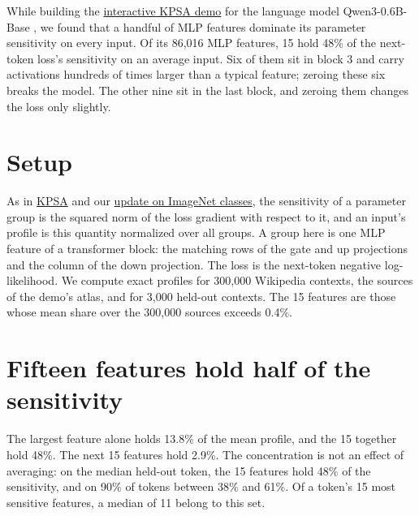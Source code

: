 \documentclass[11pt]{article}
\begin{document}

\begin{publicationhead}
\makepublicationtitle
\end{publicationhead}

While building the \href{https://axym.org/work/kpsa-demo/}{interactive KPSA demo} for the language model Qwen3-0.6B-Base \cite{qwen3}, we found that a handful of MLP features dominate its parameter sensitivity on every input. Of its 86,016 MLP features, 15 hold 48\% of the next-token loss's sensitivity on an average input. Six of them sit in block 3 and carry activations hundreds of times larger than a typical feature; zeroing these six breaks the model. The other nine sit in the last block, and zeroing them changes the loss only slightly.

\section{Setup}\label{setup}

As in \href{https://axym.org/work/kpsa/}{KPSA} \cite{kpsa} and our \href{https://axym.org/work/kpsa-class-sensitivity/}{update on ImageNet classes}, the sensitivity of a parameter group is the squared norm of the loss gradient with respect to it, and an input's profile is this quantity normalized over all groups. A group here is one MLP feature of a transformer block: the matching rows of the gate and up projections and the column of the down projection. The loss is the next-token negative log-likelihood. We compute exact profiles for 300,000 Wikipedia contexts, the sources of the demo's atlas, and for 3,000 held-out contexts. The 15 features are those whose mean share over the 300,000 sources exceeds 0.4\%.

\section{Fifteen features hold half of the sensitivity}\label{shares}

The largest feature alone holds 13.8\% of the mean profile, and the 15 together hold 48\%. The next 15 features hold 2.9\%. The concentration is not an effect of averaging: on the median held-out token, the 15 features hold 48\% of the sensitivity, and on 90\% of tokens between 38\% and 61\%. Of a token's 15 most sensitive features, a median of 11 belong to this set.
\end{document}
